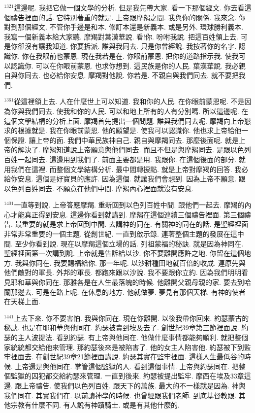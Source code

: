 \documentclass{book}
\begin{document}
$^{1321}$這邊呢.
我把它做一個文學的分析.
但是我先帶大家.
看一下那個經文.
你去看這個禱告裡面的話.
它特別著重的就是.
上帝跟摩羯之間.
我與你的關係.
我來念.
你對到那個經文.
不管你手邊是和本.
修訂本還是新義本.
或是另外.
環球勝利義本.
我寫一個新義本給大家聽.
摩羯對葉漢華說.
看!你.
吩咐我說.
把這百姓領上去.
可是你卻沒有讓我知道.
你要拆派.
誰與我同去.
只是你曾經說.
我按著你的名字.
認識你.
你在我眼前也蒙恩.
現在我若是在.
你眼前蒙恩.
把你的道路指示我.
使我可以認識你.
可以在你眼前蒙恩.
也求你想到.
這民族是你的人民.
葉漢華說.
我必親自與你同去.
也必給你安息.
摩羯對他說.
你若是.
不親自與我們同去.
就不要把我們.

$^{1361}$從這裡領上去.
人在什麼世上可以知道.
我和你的人民.
在你眼前蒙恩呢.
不是因為你與我們同去.
使我和你的人民.
可以和地上所有的人有分別嗎.
所以這邊呢.
在這個文學結構的分析上面.
摩羯首先提出一個問題.
誰與我們同去呢.
摩羯向上帝懇求的根據就是.
我在你眼前蒙恩.
他的願望是.
使我可以認識你.
他也求上帝給他一個保證.
讓上帝的面.
我們中華民族神自己.
親自與摩羯同去.
那麼後面呢.
就是上帝的解決了.
摩羯知道說上帝願意與他們同去.
而且不但是與摩羯同去.
是跟以色列百姓一起同去.
這邊用到我們了.
前面主要都是用.
我跟你.
在這個後面的部分.
就用我們在這裡.
而整個文學結構分析.
最中間轉捩點.
就是上帝對摩羯的回答.
我必給你安息.
這個是好寶貝的應許.
因為這個.
就讓我們會想到.
因為上帝不願意.
跟以色列百姓同去.
不願意在他們中間.
摩羯內心裡面就沒有安息.

$^{1401}$一直等到說.
上帝答應摩羯.
重新回到以色列百姓中間.
跟他們一起去.
摩羯的內心才能真正得到安息.
這邊你看到就講到.
摩羯在這個連續三個禱告裡面.
第三個禱告.
最重要的就是求上帝回到中間.
去講神的同在.
有關神的同在的話.
是聖經裡面非常非常重要的一個主題.
從創世紀.
一直到啟示錄.
連著整個主題的發展在這中間.
至少你看到說.
現在以摩羯這個立場的話.
列祖蒙福的秘訣.
就是因為神同在.
聖經裡面第一次講到說.
上帝就是告訴給以沙.
你不要離開應許之地.
你留在這個地方.
我與你同在.
我要賜福給你.
那一年呢.
以沙耕種田地就百倍的收成.
連原先與他們敵對的軍長.
外邦的軍長.
都跑來跟以沙說.
我不要跟你立約.
因為我們明明看見耶和華與你同在.
那雅各是在人生最落魄的時候.
他離開父親母親的家.
要去到哈蘭那邊去.
可是在路上呢.
在休息的地方.
他就做夢.
夢見有那個天梯.
有神的使者在天梯上面.

$^{1441}$上去下來.
你不要害怕.
我與你同在.
現在你離開.
以後我帶你回來.
約瑟蒙古的秘訣.
也是在耶和華與他同在.
約瑟被賣到埃及去了.
創世紀39章第三節裡面說.
約瑟的主人波提法.
看到約瑟.
有上帝與他同在.
他做什麼事情都能夠順利.
就把整個家統統都交給他來管理.
那約瑟後來是被陷害了.
他的女主人陷害他.
約瑟被下到監牢裡面去.
在創世紀39章21節裡面講說.
約瑟其實在監牢裡面.
這樣人生最低谷的時候.
上帝還是與他同在.
掌管這個監獄的人.
看到這個事情.
上帝與約瑟同在.
把整個監獄的囚犯都交給約瑟來管理.
一直到後來.
約瑟被提出監牢.
摩西在埃及33章這邊.
跟上帝禱告.
使我們以色列百姓.
跟天下的萬族.
最大的不一樣就是因為.
神與我們同在.
其實我們在.
以前讀神學的時候.
也曾經跟我們老師.
到底基督教跟.
其他宗教有什麼不同.
有人說有神蹟騎士.
或是有其他什麼的.
\end{document}
